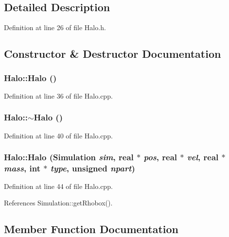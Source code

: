 \subsection{Detailed Description}


Definition at line 26 of file Halo.h.



\subsection{Constructor \& Destructor Documentation}
\subsubsection[{Halo}]{\setlength{\rightskip}{0pt plus 5cm}Halo::Halo ()}\label{classHalo_aace30bc2c9c3b1fe479550ec854f76b2}


Definition at line 36 of file Halo.cpp.

\subsubsection[{$\sim$Halo}]{\setlength{\rightskip}{0pt plus 5cm}Halo::$\sim$Halo ()}\label{classHalo_af14b14344802b6c82d9099f49b74b004}


Definition at line 40 of file Halo.cpp.

\subsubsection[{Halo}]{\setlength{\rightskip}{0pt plus 5cm}Halo::Halo ({\bf Simulation} {\em sim}, \/  {\bf real} $\ast$ {\em pos}, \/  {\bf real} $\ast$ {\em vel}, \/  {\bf real} $\ast$ {\em mass}, \/  int $\ast$ {\em type}, \/  unsigned {\em npart})}\label{classHalo_abfcf58fb0b55aea69bbc18f0053f4bce}


Definition at line 44 of file Halo.cpp.



References Simulation::getRhobox().



\subsection{Member Function Documentation}
